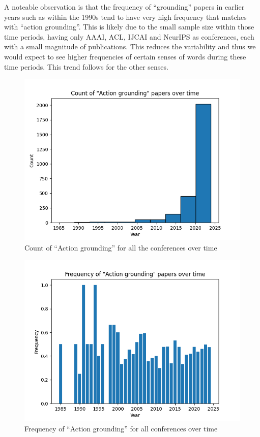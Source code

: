 \documentclass[11pt]{article}
\begin{document}
A noteable observation is that the frequency of ``grounding'' papers in earlier years such as within the 1990s tend to have very high frequency that matches with ``action grounding''. This is likely due to the small sample size within those time periods, having only AAAI, ACL, IJCAI and NeurIPS as conferences, each with a small magnitude of publications. This reduces the variability and thus we would expect to see higher frequencies of certain senses of words during these time periods. This trend follows for the other senses.
\begin{figure}[h!]
  \includegraphics[width=\columnwidth]{figs/grounding_figs/Action/all_confs_grounding_Action.png}
  \caption{Count of ``Action grounding'' for all the conferences over time}
  \label{fig:action_all_confs_count}
\end{figure}

\begin{figure}[h!]
  \includegraphics[width=\columnwidth]{figs/freq_grounding_figs/Action/all_confs_grounding_Action.png}
  \caption{Frequency of ``Action grounding'' for all conferences over time}
  \label{fig:action_all_confs_freq}
\end{figure}
\end{document}
